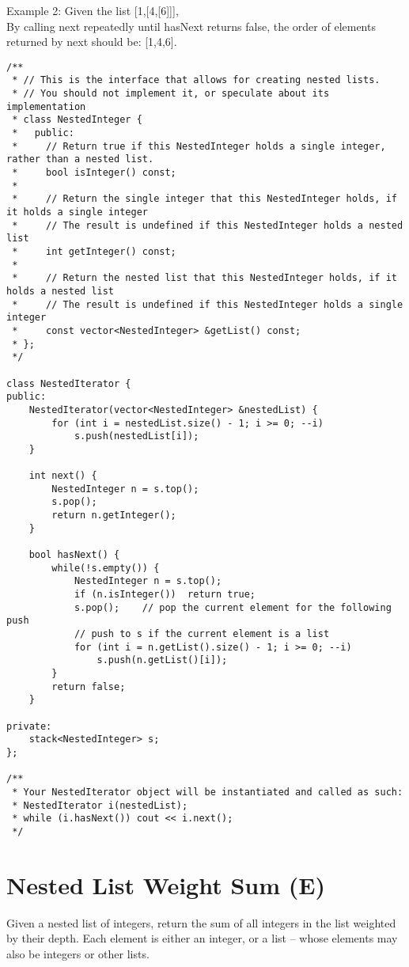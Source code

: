 Example 2: Given the list [1,[4,[6]]],\\
By calling next repeatedly until hasNext returns false, the order of elements returned by next should be: [1,4,6]. \\
 
\begin{lstlisting}
/**
 * // This is the interface that allows for creating nested lists.
 * // You should not implement it, or speculate about its implementation
 * class NestedInteger {
 *   public:
 *     // Return true if this NestedInteger holds a single integer, rather than a nested list.
 *     bool isInteger() const;
 *
 *     // Return the single integer that this NestedInteger holds, if it holds a single integer
 *     // The result is undefined if this NestedInteger holds a nested list
 *     int getInteger() const;
 *
 *     // Return the nested list that this NestedInteger holds, if it holds a nested list
 *     // The result is undefined if this NestedInteger holds a single integer
 *     const vector<NestedInteger> &getList() const;
 * };
 */
 
class NestedIterator {
public:
    NestedIterator(vector<NestedInteger> &nestedList) {
        for (int i = nestedList.size() - 1; i >= 0; --i)
            s.push(nestedList[i]);
    }

    int next() {
        NestedInteger n = s.top();
        s.pop();
        return n.getInteger();
    }

    bool hasNext() {
        while(!s.empty()) {
            NestedInteger n = s.top();
            if (n.isInteger())  return true;
            s.pop();    // pop the current element for the following push
            // push to s if the current element is a list
            for (int i = n.getList().size() - 1; i >= 0; --i)   
                s.push(n.getList()[i]);
        }
        return false;
    }
    
private:
    stack<NestedInteger> s;
};

/**
 * Your NestedIterator object will be instantiated and called as such:
 * NestedIterator i(nestedList);
 * while (i.hasNext()) cout << i.next();
 */
\end{lstlisting}


\section{Nested List Weight Sum (E)}
Given a nested list of integers, return the sum of all integers in the list weighted by their depth. Each element is either an integer, or a list -- whose elements may also be integers or other lists. \\

